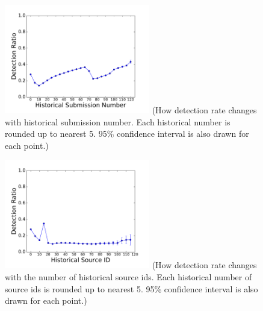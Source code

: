 

\begin{figure}[t!]
\begin{center}
\includegraphics[width=2.5in]{figure/SubNum}
{\footnotesize{(How detection rate changes with historical submission number. 
Each historical number is rounded up to nearest 5.
95\% confidence interval is also drawn for each point.)}}
\end{center}
\end{figure}

\begin{figure}[t!]
\begin{center}
\includegraphics[width=2.5in]{figure/SubID}
{\footnotesize{(How detection rate changes with the number of historical source ids. 
Each historical number of source ids is rounded up to nearest 5.
95\% confidence interval is also drawn for each point.)}  
}
\end{center}
\end{figure}

